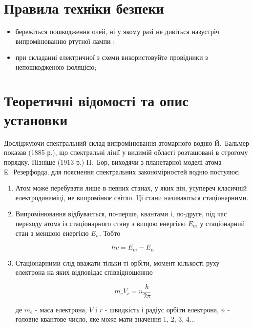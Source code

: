 \documentclass[twocolumn]{el-author}
\begin{document}
\section{Правила техніки безпеки}

\begin{itemize}
	\item  бережіться пошкодження очей, ні у якому разі не дивіться
назустріч випромінюванню ртутної лампи ;
	\item  при складанні електричної з схеми використовуйте
провідники з непошкодженою ізоляцією;
\end{itemize}

\section{Теоретичні відомості та опис установки}

Досліджуючи спектральний склад випромінювання атомарного водню
Й.~Бальмер показав (1885 р.), що спектральні лінії у видимій області
розташовані в строгому порядку. Пізніше (1913 р.) Н.~Бор, виходячи з
планетарної моделі атома Е.~Резерфорда, для пояснення спектральних
закономірностей водню постулює:

\begin{enumerate}
	\item Атом може перебувати лише в певних станах, у яких він,
усупереч класичній електродинаміці, не випромінює світло. Ці
стани називаються стаціонарними.
	\item Випромінювання відбувається, по-перше, квантами і, по-друге,
під час переходу атома із стаціонарного стану з вищою енергією
$E_{m}$ у стаціонарний стан з меншою енергією $E_{n}$. Тобто

\begin{equation} \label{eq:1}
hv = E_{m} - E_{n}
\end{equation}

	\item Стаціонарними слід вважати тільки ті орбіти, момент кількості
руху електрона на яких відповідає співвідношенню

\begin{equation} \label{eq:2}
m_{e}V_{r} = n \frac{h}{2 \pi}
\end{equation}

де $m_{e}$ - маса електрона, $V$ і $r$ - швидкість і радіус орбіти
електрона, $n$ - головне квантове число, яке може мати значення 1, 2, 3, 4...
\end{enumerate}
\end{document}
